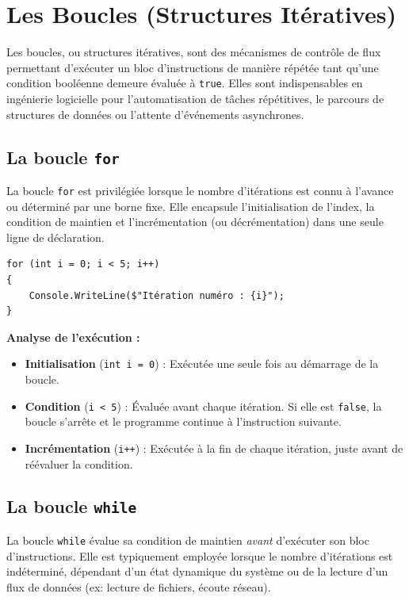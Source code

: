
\newpage
\section{Les Boucles (Structures Itératives)}

Les boucles, ou structures itératives, sont des mécanismes de contrôle de flux permettant d'exécuter un bloc d'instructions de manière répétée tant qu'une condition booléenne demeure évaluée à \texttt{true}. Elles sont indispensables en ingénierie logicielle pour l'automatisation de tâches répétitives, le parcours de structures de données ou l'attente d'événements asynchrones.

\subsection{La boucle \texttt{for}}
La boucle \texttt{for} est privilégiée lorsque le nombre d'itérations est connu à l'avance ou déterminé par une borne fixe. Elle encapsule l'initialisation de l'index, la condition de maintien et l'incrémentation (ou décrémentation) dans une seule ligne de déclaration.

\begin{lstlisting}[style=csharpstyle]
for (int i = 0; i < 5; i++)
{
    Console.WriteLine($"Itération numéro : {i}");
}
\end{lstlisting}

\textbf{Analyse de l'exécution :}
\begin{itemize}
    \item \textbf{Initialisation} (\texttt{int i = 0}) : Exécutée une seule fois au démarrage de la boucle.
    \item \textbf{Condition} (\texttt{i < 5}) : Évaluée avant chaque itération. Si elle est \texttt{false}, la boucle s'arrête et le programme continue à l'instruction suivante.
    \item \textbf{Incrémentation} (\texttt{i++}) : Exécutée à la fin de chaque itération, juste avant de réévaluer la condition.
\end{itemize}

\subsection{La boucle \texttt{while}}
La boucle \texttt{while} évalue sa condition de maintien \textit{avant} d'exécuter son bloc d'instructions. Elle est typiquement employée lorsque le nombre d'itérations est indéterminé, dépendant d'un état dynamique du système ou de la lecture d'un flux de données (ex: lecture de fichiers, écoute réseau).

